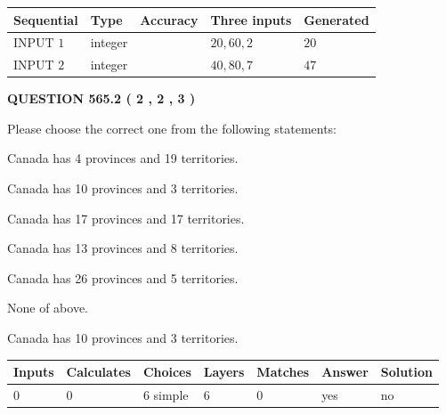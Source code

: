 \documentclass[12pt]{article}
\begin{document}
  
\noindent\begin{tabular}{|l|l|l|l|l|}
\hline
 Sequential & Type & Accuracy & Three inputs & Generated \\ 
\hline
 
 
  INPUT $  1 $ & integer &  & $
 20
 , 
 60
 , 
 2
 $ & $ 20 $ 
 \\  \hline  
 
 
  INPUT $  2 $ & integer &  & $
 40
 , 
 80
 , 
 7
 $ & $ 47 $ 
 \\  \hline  
 \end{tabular}
   
   
  
\vspace{0.2in}
  
{\textbf{\Large{QUESTION
565.2 
 ( 2 , 2 , 3 )
}}}
  
  
Please choose the correct one from the following statements:
 
 
Canada has   4 provinces and  19 territories.
 
 
Canada has 10  provinces and 3 territories.
 
 
Canada has  17 provinces and  17 territories.
 
 
Canada has  13 provinces and  8 territories.
 
 
Canada has  26 provinces and  5 territories.
 
 
 None of above.
 
 
\noindent{}
 
 
Canada has 10  provinces and 3 territories.
 
 
\noindent{}
 
 
   
   
   
   
\noindent\begin{tabular}{|l|l|l|l|l|l|l|}
 \hline
Inputs & Calculates & Choices & Layers & Matches & Answer & Solution \\ \hline
 0  & 
 0  & 
 6
  simple  
  & 
 6  & 
 0  & 
  yes & 
  no 
  \\ \hline
 \end{tabular}
   
\end{document}
